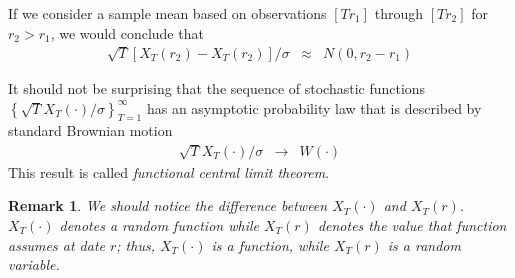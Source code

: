 \documentclass{article}
\newtheorem{remark}{Remark}
\begin{document}
If we consider a sample mean based on observations $[Tr_{1}]$ through $[Tr_{2}]$ for $r_{2}>r_{1}$, we would conclude that 
\begin{eqnarray*}
\sqrt{T}\left[X_{T}(r_{2})-X_{T}(r_{2})\right]/\sigma&\approx&N(0,r_{2}-r_{1})
\end{eqnarray*}

It should not be surprising that the sequence of stochastic functions $\left\{\sqrt{T}X_{T}(\cdot)/\sigma\right\}_{T=1}^{\infty}$ has an asymptotic probability law that is described by standard Brownian motion
\begin{eqnarray*}
\sqrt{T}X_{T}(\cdot)/\sigma&\to&W(\cdot)
\end{eqnarray*}
This result is called \textit{functional central limit theorem}.
\begin{remark}
We should notice the difference between $X_{T}(\cdot)$ and $X_{T}(r)$. $X_{T}(\cdot)$ denotes a random function while $X_{T}(r)$ denotes the value that function assumes at date $r$; thus, $X_{T}(\cdot)$ is a function, while $X_{T}(r)$ is a random variable.
\end{remark}
\end{document}
